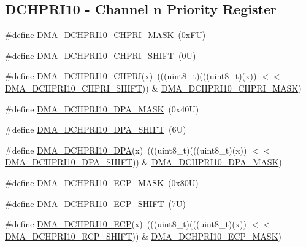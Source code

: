 \subsection*{D\+C\+H\+P\+R\+I10 -\/ Channel n Priority Register}
\begin{DoxyCompactItemize}
\item 
\#define \mbox{\hyperlink{group___d_m_a___register___masks_ga3b501306e4d14b013245e0cc3b4758dc}{D\+M\+A\+\_\+\+D\+C\+H\+P\+R\+I10\+\_\+\+C\+H\+P\+R\+I\+\_\+\+M\+A\+SK}}~(0x\+F\+U)
\item 
\#define \mbox{\hyperlink{group___d_m_a___register___masks_ga5932de8a8d3c8b2b657f415258c430d9}{D\+M\+A\+\_\+\+D\+C\+H\+P\+R\+I10\+\_\+\+C\+H\+P\+R\+I\+\_\+\+S\+H\+I\+FT}}~(0\+U)
\item 
\#define \mbox{\hyperlink{group___d_m_a___register___masks_ga7ee0614761b3613aab2fce3979145c3a}{D\+M\+A\+\_\+\+D\+C\+H\+P\+R\+I10\+\_\+\+C\+H\+P\+RI}}(x)~(((uint8\+\_\+t)(((uint8\+\_\+t)(x)) $<$$<$ \mbox{\hyperlink{group___d_m_a___register___masks_ga5932de8a8d3c8b2b657f415258c430d9}{D\+M\+A\+\_\+\+D\+C\+H\+P\+R\+I10\+\_\+\+C\+H\+P\+R\+I\+\_\+\+S\+H\+I\+FT}})) \& \mbox{\hyperlink{group___d_m_a___register___masks_ga3b501306e4d14b013245e0cc3b4758dc}{D\+M\+A\+\_\+\+D\+C\+H\+P\+R\+I10\+\_\+\+C\+H\+P\+R\+I\+\_\+\+M\+A\+SK}})
\item 
\#define \mbox{\hyperlink{group___d_m_a___register___masks_gaf20edd13f4d37134819d152681b34b4e}{D\+M\+A\+\_\+\+D\+C\+H\+P\+R\+I10\+\_\+\+D\+P\+A\+\_\+\+M\+A\+SK}}~(0x40\+U)
\item 
\#define \mbox{\hyperlink{group___d_m_a___register___masks_ga81809b2ae57f16cec20cb50f1a4a8b1e}{D\+M\+A\+\_\+\+D\+C\+H\+P\+R\+I10\+\_\+\+D\+P\+A\+\_\+\+S\+H\+I\+FT}}~(6\+U)
\item 
\#define \mbox{\hyperlink{group___d_m_a___register___masks_gab1b5578e5333be1a5a8e6b2a5a2920b4}{D\+M\+A\+\_\+\+D\+C\+H\+P\+R\+I10\+\_\+\+D\+PA}}(x)~(((uint8\+\_\+t)(((uint8\+\_\+t)(x)) $<$$<$ \mbox{\hyperlink{group___d_m_a___register___masks_ga81809b2ae57f16cec20cb50f1a4a8b1e}{D\+M\+A\+\_\+\+D\+C\+H\+P\+R\+I10\+\_\+\+D\+P\+A\+\_\+\+S\+H\+I\+FT}})) \& \mbox{\hyperlink{group___d_m_a___register___masks_gaf20edd13f4d37134819d152681b34b4e}{D\+M\+A\+\_\+\+D\+C\+H\+P\+R\+I10\+\_\+\+D\+P\+A\+\_\+\+M\+A\+SK}})
\item 
\#define \mbox{\hyperlink{group___d_m_a___register___masks_ga7a9d675356e6d5951279c4781bb5a1c7}{D\+M\+A\+\_\+\+D\+C\+H\+P\+R\+I10\+\_\+\+E\+C\+P\+\_\+\+M\+A\+SK}}~(0x80\+U)
\item 
\#define \mbox{\hyperlink{group___d_m_a___register___masks_ga9d6bb10c4809a0eb5120c5e7cdf6adfc}{D\+M\+A\+\_\+\+D\+C\+H\+P\+R\+I10\+\_\+\+E\+C\+P\+\_\+\+S\+H\+I\+FT}}~(7\+U)
\item 
\#define \mbox{\hyperlink{group___d_m_a___register___masks_gaecb1fba6068af661ee3bb6d599e694db}{D\+M\+A\+\_\+\+D\+C\+H\+P\+R\+I10\+\_\+\+E\+CP}}(x)~(((uint8\+\_\+t)(((uint8\+\_\+t)(x)) $<$$<$ \mbox{\hyperlink{group___d_m_a___register___masks_ga9d6bb10c4809a0eb5120c5e7cdf6adfc}{D\+M\+A\+\_\+\+D\+C\+H\+P\+R\+I10\+\_\+\+E\+C\+P\+\_\+\+S\+H\+I\+FT}})) \& \mbox{\hyperlink{group___d_m_a___register___masks_ga7a9d675356e6d5951279c4781bb5a1c7}{D\+M\+A\+\_\+\+D\+C\+H\+P\+R\+I10\+\_\+\+E\+C\+P\+\_\+\+M\+A\+SK}})
\end{DoxyCompactItemize}
